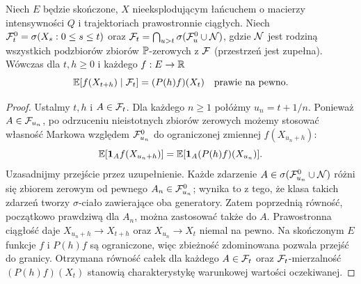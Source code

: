 \begin{lemat}
\label{lem:markov-aug}
Niech $E$ będzie skończone, $X$ nieeksplodującym łańcuchem
o macierzy intensywności $Q$ i trajektoriach prawostronnie
ciągłych. Niech $\mathcal{F}_t^0=\sigma(X_s:0\le s\le t)$
oraz
$\mathcal{F}_t=\bigcap_{u>t}\sigma(\mathcal{F}_u^0\cup\mathcal{N})$,
gdzie $\mathcal{N}$ jest rodziną wszystkich podzbiorów zbiorów
$\mathbb{P}$-zerowych z $\mathcal{F}$ (przestrzeń jest zupełna).
Wówczas dla $t,h\ge0$ i każdego $f:E\to\mathbb{R}$
\[
\mathbb{E}[f(X_{t+h})\mid\mathcal{F}_t]=(P(h)f)(X_t)
\quad\text{prawie na pewno}.
\]
\end{lemat}
\begin{proof}
Ustalmy $t,h$ i $A\in\mathcal{F}_t$. Dla każdego $n\ge1$
połóżmy $u_n=t+1/n$. Ponieważ $A\in\mathcal{F}_{u_n}$,
po odrzuceniu nieistotnych zbiorów zerowych możemy
stosować własność Markowa względem $\mathcal{F}_{u_n}^0$
do ograniczonej zmiennej $f(X_{u_n+h})$:
\[
\mathbb{E}[\mathbf{1}_{A} f(X_{u_n+h})]
 =\mathbb{E}[\mathbf{1}_{A}(P(h)f)(X_{u_n})].
\]
Uzasadnijmy przejście przez uzupełnienie. Każde zdarzenie
$A\in\sigma(\mathcal{F}_{u_n}^0\cup\mathcal{N})$ różni się
zbiorem zerowym od pewnego $A_n\in\mathcal{F}_{u_n}^0$;
wynika to z tego, że klasa takich zdarzeń tworzy
$\sigma$-ciało zawierające oba generatory. Zatem
poprzednią równość, początkowo prawdziwą dla $A_n$,
można zastosować także do $A$.
Prawostronna ciągłość daje $X_{u_n+h}\to X_{t+h}$
oraz $X_{u_n}\to X_t$ niemal na pewno.
Na skończonym $E$ funkcje $f$ i $P(h)f$ są ograniczone,
więc zbieżność zdominowana pozwala przejść do granicy.
Otrzymana równość całek dla każdego $A\in\mathcal{F}_t$
oraz $\mathcal{F}_t$-mierzalność $(P(h)f)(X_t)$
stanowią charakterystykę warunkowej wartości oczekiwanej.
\end{proof}

